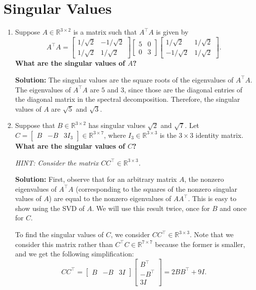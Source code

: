 \documentclass[10pt]{article}
\newcommand{\RR}{\mathbb{R}}
\begin{document}
\section{Singular Values}

\begin{enumerate}[label=(\alph*)]
\item Suppose $A \in \RR^{3 \times 2}$ is a matrix such that $A^\top A$ is given by
\begin{equation}
A^\top A = \begin{bmatrix} 1/\sqrt{2} & -1/\sqrt{2} \\ 1/\sqrt{2} & 1/\sqrt{2} \end{bmatrix} \begin{bmatrix} 5 & 0 \\ 0 & 3 \end{bmatrix} \begin{bmatrix} 1/\sqrt{2} & 1/\sqrt{2} \\ -1/\sqrt{2} & 1/\sqrt{2} \end{bmatrix}.
\end{equation}
\textbf{What are the singular values of $A$?}

\textbf{Solution:} The singular values are the square roots of the eigenvalues of $A^\top A$. The eigenvalues of $A^\top A$ are $5$ and $3$, since those are the diagonal entries of the diagonal matrix in the spectral decomposition. Therefore, the singular values of $A$ are $\sqrt{5}$ and $\sqrt{3}$.

\item Suppose that $B \in \RR^{3 \times 2}$ has singular values $\sqrt{2}$ and $\sqrt{7}$. Let $C = \begin{bmatrix} B & -B & 3I_3 \end{bmatrix} \in \RR^{3 \times 7}$, where $I_3 \in \RR^{3 \times 3}$ is the $3 \times 3$ identity matrix. \textbf{What are the singular values of $C$?}

\emph{HINT: Consider the matrix $CC^\top \in \RR^{3 \times 3}$.}

\textbf{Solution:} First, observe that for an arbitrary matrix $A$, the nonzero eigenvalues of $A^\top A$ (corresponding to the squares of the nonzero singular values of $A$) are equal to the nonzero eigenvalues of $AA^\top$. This is easy to show using the SVD of $A$. We will use this result twice, once for $B$ and once for $C$.

To find the singular values of $C$, we consider $CC^\top \in \RR^{3 \times 3}$. Note that we consider this matrix rather than $C^\top C \in \RR^{7 \times 7}$ because the former is smaller, and we get the following simplification:
\begin{equation}
CC^\top = \begin{bmatrix} B & -B & 3I \end{bmatrix} \begin{bmatrix} B^\top \\ -B^\top \\ 3I \end{bmatrix} = 2BB^\top + 9I.
\end{equation}


\end{enumerate}
\end{document}
